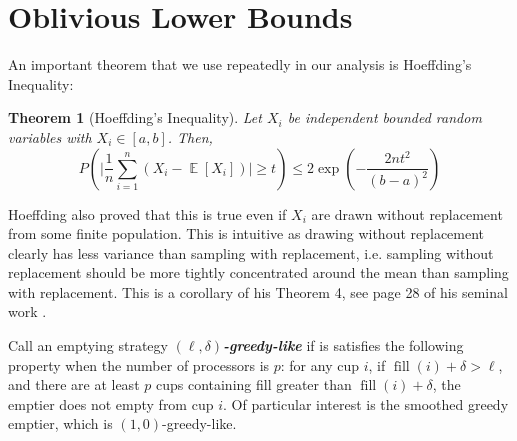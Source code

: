 \documentclass[twocolumn]{article}[11pt]
\newcommand{\defn}[1]{{\textit{\textbf{\boldmath #1}}}}
\DeclareMathOperator{\E}{\mathbb{E}}
\DeclareMathOperator{\fil}{\text{fill}}
\newtheorem{theorem}{Theorem}
\begin{document}
\section{Oblivious Lower Bounds}\label{sec:oblivious}

An important theorem that we use repeatedly in our analysis is Hoeffding's Inequality:
\begin{theorem}[Hoeffding's Inequality]
  Let $X_i$ be independent bounded random variables with $X_i \in [a,b]$. Then,
  $$P\left(\Big|\frac{1}{n} \sum_{i=1}^n (X_i - \E[X_i])\Big|\ge t\right) \le
  2\exp\left(-\frac{2nt^2}{(b-a)^2}\right) $$
\end{theorem}
Hoeffding also proved that this is true even if $X_i$ are drawn without
replacement from some finite population. This is intuitive as drawing without
replacement clearly has less variance than sampling with replacement, i.e.
sampling without replacement should be more tightly concentrated around the
mean than sampling with replacement. This is a corollary of his Theorem 4, see
page 28 of his seminal work \cite{who62}.

Call an emptying strategy $(\ell, \delta)$\defn{-greedy-like} if is satisfies
the following property when the number of processors is $p$: for any cup
$i$, if $\fil(i) + \delta > \ell$, and there are at least $p$ cups containing fill
greater than $\fil(i) + \delta$, the emptier does not empty from cup $i$.
Of particular interest is the smoothed greedy emptier, which is $(1, 0)$-greedy-like.
\end{document}
